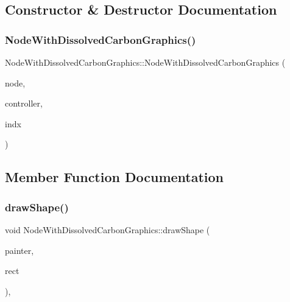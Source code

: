 \subsection{Constructor \& Destructor Documentation}
\mbox{\label{class_node_with_dissolved_carbon_graphics_a2cff6dd2fd7d856a5074ef4f4b7c9127}} 
\subsubsection{\texorpdfstring{NodeWithDissolvedCarbonGraphics()}{NodeWithDissolvedCarbonGraphics()}}
{\footnotesize\ttfamily Node\+With\+Dissolved\+Carbon\+Graphics\+::\+Node\+With\+Dissolved\+Carbon\+Graphics (\begin{DoxyParamCaption}\item[{\mbox{\hyperlink{class_node_data}{Node\+Data}} $\ast$}]{node,  }\item[{\mbox{\hyperlink{class_map_objects_controller}{Map\+Objects\+Controller}} $\ast$}]{controller,  }\item[{int}]{indx }\end{DoxyParamCaption})\hspace{0.3cm}{\ttfamily [inline]}}



\subsection{Member Function Documentation}
\mbox{\label{class_node_with_dissolved_carbon_graphics_a98cde82efaa972b0a66620bff648cfbe}} 
\subsubsection{\texorpdfstring{drawShape()}{drawShape()}}
{\footnotesize\ttfamily void Node\+With\+Dissolved\+Carbon\+Graphics\+::draw\+Shape (\begin{DoxyParamCaption}\item[{Q\+Painter \&}]{painter,  }\item[{const qmapcontrol\+::\+Rect\+World\+Px \&}]{rect }\end{DoxyParamCaption})\hspace{0.3cm}{\ttfamily [protected]}, {\ttfamily [virtual]}}



